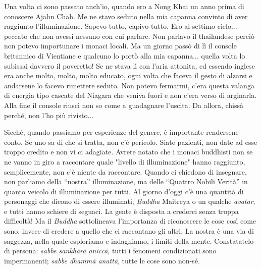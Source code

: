 Una volta ci sono passato anch'io, quando ero a Nong Khai un anno prima
di conoscere Ajahn Chah. Me ne stavo seduto nella mia capanna convinto
di aver raggiunto l'illuminazione. Sapevo tutto, capivo tutto. Ero al
settimo cielo... peccato che non avessi nessuno con cui parlare. Non
parlavo il thailandese perciò non potevo importunare i monaci locali. Ma
un giorno passò di lì il console britannico di Vientiane e qualcuno lo
portò alla mia capanna... quella volta lo subissai davvero il poveretto!
Se ne stava lì con l'aria attonita, ed essendo inglese era anche molto,
molto, molto educato, ogni volta che faceva il gesto di alzarsi e
andarsene lo facevo rimettere seduto. Non potevo fermarmi, c'era questa
valanga di energia tipo cascate del Niagara che veniva fuori e non c'era
verso di arginarla. Alla fine il console riuscì non so come a guadagnare
l'uscita. Da allora, chissà perché, non l'ho più rivisto...

Sicché, quando passiamo per esperienze del genere, è importante
rendersene conto. Se uno sa di che si tratta, non c'è pericolo. Siate
pazienti, non date ad esse troppo credito e non vi ci adagiate. Avrete
notato che i monaci buddhisti non se ne vanno in giro a raccontare quale
"livello di illuminazione" hanno raggiunto, semplicemente, non c'è
niente da raccontare. Quando ci chiedono di insegnare, non parliamo
della “nostra” illuminazione, ma delle “Quattro Nobili Verità” in quanto
veicolo di illuminazione per tutti. Al giorno d'oggi c'è una quantità di
personaggi che dicono di essere illuminati, \textit{Buddha} Maitreya o un qualche
\textit{avatar}, e tutti hanno schiere di seguaci. La gente è disposta a crederci
senza troppa difficoltà! Ma il \textit{Buddha} sottolineava l'importanza di
riconoscere le cose così come sono, invece di credere a quello che ci
raccontano gli altri. La nostra è una via di saggezza, nella quale
esploriamo e indaghiamo, i limiti della mente. Constatatelo di persona:
\textit{sabbe sankhārā aniccā}, tutti i fenomeni condizionati sono impermanenti;
\textit{sabbe dhammā anattā}, tutte le cose sono non-sé.
